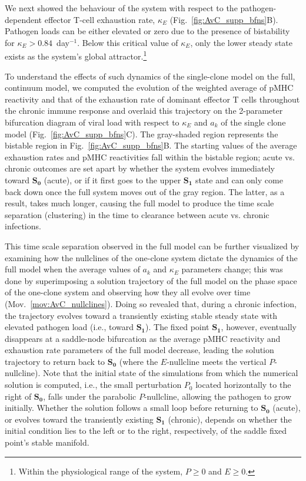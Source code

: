 We next showed the behaviour of the system with respect to the pathogen-dependent effector T-cell exhaustion rate, $\kappa_E$ (Fig.~\ref{fig:AvC_supp_bfns}B). Pathogen loads can be either elevated or zero due to the presence of bistability for $\kappa_E > 0.84$~day$^{-1}$. Below this critical value of $\kappa_E$, only the lower steady state exists as the system’s global attractor.\footnote{Within the physiological range of the system, $P \ge 0$ and $E \ge 0$.}

To understand the effects of such dynamics of the single-clone model on the full, continuum model, we computed the evolution of the weighted average of pMHC reactivity and that of the exhaustion rate of dominant effector T cells throughout the chronic immune response and overlaid this trajectory on the 2-parameter bifurcation diagram of viral load with respect to $\kappa_E$ and $a_k$ of the single clone model (Fig.~\ref{fig:AvC_supp_bfns}C). The gray-shaded region represents the bistable region in Fig.~\ref{fig:AvC_supp_bfns}B. The starting values of the average exhaustion rates and pMHC reactivities fall within the bistable region; acute vs. chronic outcomes are set apart by whether the system evolves immediately toward $\boldsymbol{S_0}$ (acute), or if it first goes to the upper $\boldsymbol{S_1}$ state and can only come back down once the full system moves out of the gray region. The latter, as a result, takes much longer, causing the full model to produce the time scale separation (clustering) in the time to clearance between acute vs. chronic infections.

This time scale separation observed in the full model can be further visualized by examining how the nullclines of the one-clone system dictate the dynamics of the full model when the average values of $a_k$ and  $\kappa_E$ parameters change; this was done by superimposing a solution trajectory of the full model on the phase space of the one-clone system and observing how they all evolve over time (Mov.~\ref{mov:AvC_nullclines}). Doing so revealed that, during a chronic infection, the trajectory evolves toward a transiently existing stable steady state with elevated pathogen load (i.e., toward $\boldsymbol{S_1}$). The fixed point $\boldsymbol{S_1}$, however, eventually disappears at a saddle-node bifurcation as the average pMHC reactivity and exhaustion rate parameters of the full model decrease, leading the solution trajectory to return back to $\boldsymbol{S_0}$ (where the $E$-nullcline meets the vertical $P$-nullcline). Note that the initial state of the simulations from which the numerical solution is computed, i.e., the small perturbation $P_0$ located horizontally to the right of $\boldsymbol{S_0}$, falls under the parabolic $P$-nullcline, allowing the pathogen to grow initially. Whether the solution follows a small loop before returning to $\boldsymbol{S_0}$ (acute), or evolves toward the transiently existing $\boldsymbol{S_1}$ (chronic), depends on whether the initial condition lies to the left or to the right, respectively, of the saddle fixed point’s stable manifold.

